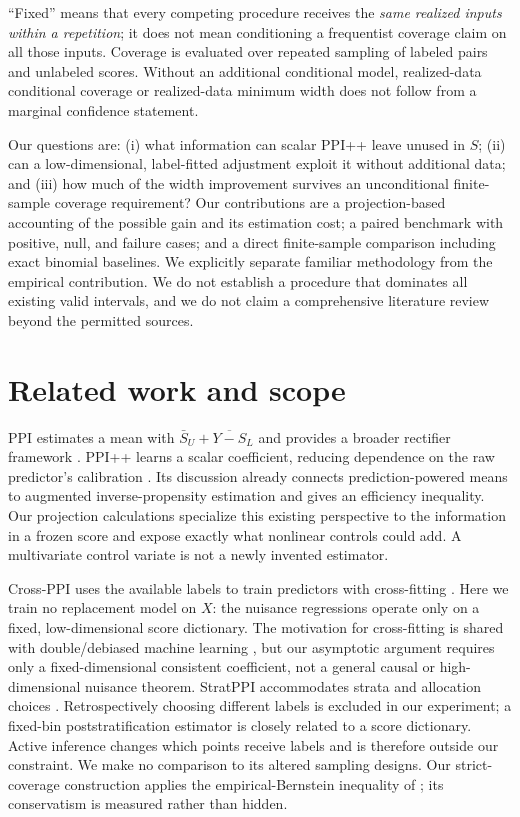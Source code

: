 \documentclass{article}
\begin{document}
``Fixed'' means that every competing procedure receives the \emph{same realized inputs within a repetition}; it does not mean conditioning a frequentist coverage claim on all those inputs. Coverage is evaluated over repeated sampling of labeled pairs and unlabeled scores. Without an additional conditional model, realized-data conditional coverage or realized-data minimum width does not follow from a marginal confidence statement.

Our questions are: (i) what information can scalar PPI++ leave unused in $S$; (ii) can a low-dimensional, label-fitted adjustment exploit it without additional data; and (iii) how much of the width improvement survives an unconditional finite-sample coverage requirement? Our contributions are a projection-based accounting of the possible gain and its estimation cost; a paired benchmark with positive, null, and failure cases; and a direct finite-sample comparison including exact binomial baselines. We explicitly separate familiar methodology from the empirical contribution. We do not establish a procedure that dominates all existing valid intervals, and we do not claim a comprehensive literature review beyond the permitted sources.

\section{Related work and scope}
PPI estimates a mean with $\bar S_U+\overline{Y-S}_L$ and provides a broader rectifier framework \citep{ppi}. PPI++ learns a scalar coefficient, reducing dependence on the raw predictor's calibration \citep{ppiplus}. Its discussion already connects prediction-powered means to augmented inverse-propensity estimation and gives an efficiency inequality. Our projection calculations specialize this existing perspective to the information in a frozen score and expose exactly what nonlinear controls could add. A multivariate control variate is not a newly invented estimator.

Cross-PPI uses the available labels to train predictors with cross-fitting \citep{crossppi}. Here we train no replacement model on $X$: the nuisance regressions operate only on a fixed, low-dimensional score dictionary. The motivation for cross-fitting is shared with double/debiased machine learning \citep{dml}, but our asymptotic argument requires only a fixed-dimensional consistent coefficient, not a general causal or high-dimensional nuisance theorem. StratPPI accommodates strata and allocation choices \citep{stratified}. Retrospectively choosing different labels is excluded in our experiment; a fixed-bin poststratification estimator is closely related to a score dictionary. Active inference changes which points receive labels \citep{active} and is therefore outside our constraint. We make no comparison to its altered sampling designs. Our strict-coverage construction applies the empirical-Bernstein inequality of \citet{bernstein}; its conservatism is measured rather than hidden.
\end{document}
